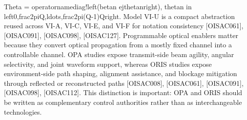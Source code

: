 {}\markdownRendererDollarSign{}\markdownRendererDollarSign{}\markdownRendererSoftLineBreak
{}\markdownRendererDollarSign{}\markdownRendererDollarSign{}\markdownRendererSoftLineBreak
{}\markdownRendererBackslash{}Theta = \markdownRendererBackslash{}operatorname\markdownRendererLeftBrace{}diag\markdownRendererRightBrace{}!\markdownRendererBackslash{}left(\markdownRendererBackslash{}beta\markdownRendererUnderscore{}n e\markdownRendererCircumflex{}\markdownRendererLeftBrace{}j\markdownRendererBackslash{}theta\markdownRendererUnderscore{}n\markdownRendererRightBrace{}\markdownRendererBackslash{}right),\markdownRendererSoftLineBreak
{}\markdownRendererDollarSign{}\markdownRendererDollarSign{}\markdownRendererSoftLineBreak
{}\markdownRendererDollarSign{}\markdownRendererDollarSign{}\markdownRendererSoftLineBreak
{}\markdownRendererBackslash{}theta\markdownRendererUnderscore{}n \markdownRendererBackslash{}in \markdownRendererBackslash{}left\markdownRendererLeftBrace{}0,\markdownRendererBackslash{}frac\markdownRendererLeftBrace{}2\markdownRendererBackslash{}pi\markdownRendererRightBrace{}\markdownRendererLeftBrace{}Q\markdownRendererRightBrace{},\markdownRendererBackslash{}ldots,\markdownRendererBackslash{}frac\markdownRendererLeftBrace{}2\markdownRendererBackslash{}pi(Q-1)\markdownRendererRightBrace{}\markdownRendererLeftBrace{}Q\markdownRendererRightBrace{}\markdownRendererBackslash{}right\markdownRendererRightBrace{}.\markdownRendererSoftLineBreak
{}\markdownRendererDollarSign{}\markdownRendererDollarSign{}\markdownRendererParagraphSeparator
{}Model VI-U is a compact abstraction reused across VI-A, VI-C, VI-E, and VI-F for notation consistency [O\markdownRendererUnderscore{}ISAC\markdownRendererUnderscore{}061], [O\markdownRendererUnderscore{}ISAC\markdownRendererUnderscore{}091], [O\markdownRendererUnderscore{}ISAC\markdownRendererUnderscore{}098], [O\markdownRendererUnderscore{}ISAC\markdownRendererUnderscore{}127].\markdownRendererBlockQuoteEnd \markdownRendererInterblockSeparator
{}\markdownRendererSectionBegin
{}\markdownRendererInterblockSeparator
{}Programmable optical enablers matter because they convert optical propagation from a mostly fixed channel into a controllable channel. OPA studies expose transmit-side beam agility, angular selectivity, and joint waveform support, whereas ORIS studies expose environment-side path shaping, alignment assistance, and blockage mitigation through reflected or reconstructed paths [O\markdownRendererUnderscore{}ISAC\markdownRendererUnderscore{}008], [O\markdownRendererUnderscore{}ISAC\markdownRendererUnderscore{}061], [O\markdownRendererUnderscore{}ISAC\markdownRendererUnderscore{}091], [O\markdownRendererUnderscore{}ISAC\markdownRendererUnderscore{}098], [O\markdownRendererUnderscore{}ISAC\markdownRendererUnderscore{}112]. This distinction is important: OPA and ORIS should be written as complementary control authorities rather than as interchangeable technologies.\markdownRendererParagraphSeparator
